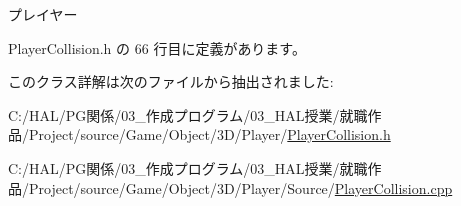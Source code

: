 プレイヤー 



 Player\+Collision.\+h の 66 行目に定義があります。



このクラス詳解は次のファイルから抽出されました\+:\begin{DoxyCompactItemize}
\item 
C\+:/\+H\+A\+L/\+P\+G関係/03\+\_\+作成プログラム/03\+\_\+\+H\+A\+L授業/就職作品/\+Project/source/\+Game/\+Object/3\+D/\+Player/\mbox{\hyperlink{_player_collision_8h}{Player\+Collision.\+h}}\item 
C\+:/\+H\+A\+L/\+P\+G関係/03\+\_\+作成プログラム/03\+\_\+\+H\+A\+L授業/就職作品/\+Project/source/\+Game/\+Object/3\+D/\+Player/\+Source/\mbox{\hyperlink{_player_collision_8cpp}{Player\+Collision.\+cpp}}\end{DoxyCompactItemize}
